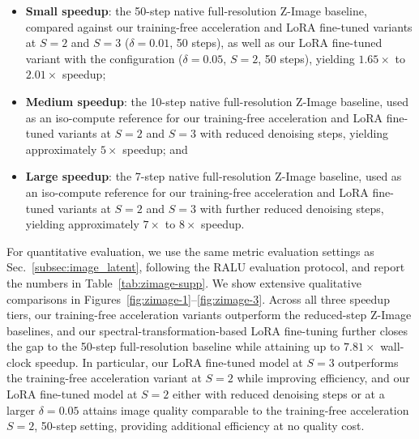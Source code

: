 \begin{itemize}
    \item \textbf{Small speedup}: the 50-step native full-resolution Z-Image baseline, compared against our training-free acceleration and LoRA fine-tuned variants at $S=2$ and $S=3$ ($\delta=0.01$, 50 steps), as well as our LoRA fine-tuned variant with the configuration ($\delta=0.05$, $S=2$, 50 steps), yielding $1.65\times$ to $2.01\times$ speedup;
    \item \textbf{Medium speedup}: the 10-step native full-resolution Z-Image baseline, used as an iso-compute reference for our training-free acceleration and LoRA fine-tuned variants at $S=2$ and $S=3$ with reduced denoising steps, yielding approximately $5\times$ speedup; and
    \item \textbf{Large speedup}: the 7-step native full-resolution Z-Image baseline, used as an iso-compute reference for our training-free acceleration and LoRA fine-tuned variants at $S=2$ and $S=3$ with further reduced denoising steps, yielding approximately $7\times$ to $8\times$ speedup.
\end{itemize}
For quantitative evaluation, we use the same metric evaluation settings as Sec.~\ref{subsec:image_latent}, following the RALU evaluation protocol, and report the numbers in Table~\ref{tab:zimage-supp}. We show extensive qualitative comparisons in Figures~\ref{fig:zimage-1}--\ref{fig:zimage-3}. Across all three speedup tiers, our training-free acceleration variants outperform the reduced-step Z-Image baselines, and our spectral-transformation-based LoRA fine-tuning further closes the gap to the 50-step full-resolution baseline while attaining up to $7.81\times$ wall-clock speedup. In particular, our LoRA fine-tuned model at $S=3$ outperforms the training-free acceleration variant at $S=2$ while improving efficiency, and our LoRA fine-tuned model at $S=2$ either with reduced denoising steps or at a larger $\delta=0.05$ attains image quality comparable to the training-free acceleration $S=2$, 50-step setting, providing additional efficiency at no quality cost.




